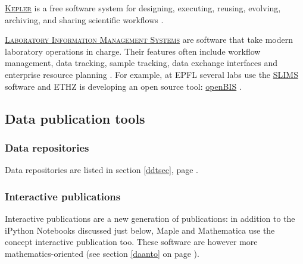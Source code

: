 \noindent {} \textsc{\href{https://kepler-project.org/}{Kepler}} is a free software system for designing, executing, reusing, evolving, archiving, and sharing scientific workflows \cite{kepler-project.org_kepler_2015,kepler-project.org_kepler_2015-1}.

\vspace{0.4cm}

\noindent {}   \textsc{\href{https://en.wikipedia.org/wiki/Laboratory_information_management_system}{Laboratory Information Management Systems}} are software that take modern laboratory operations in charge. Their features often include workflow management, data tracking, sample tracking, data exchange interfaces and enterprise resource planning \cite{wikipedia_laboratory_2015}. For example, at EPFL several labs use the \href{http://sv-it.epfl.ch/slims}{SLIMS} software and ETHZ is developing an open source tool: \href{http://www.cisd.ethz.ch/software/openBIS}{openBIS} \cite{ethz_eth_2015,epfl_lsis_2015}.


\subsection{Data publication tools}

\subsubsection{Data repositories}

Data repositories are listed in section \ref{ddtsec}, page \pageref{ddtsec}.

\subsubsection{Interactive publications}

Interactive publications are a new generation of publications: in addition to the iPython Notebooks  discussed just below, Maple and Mathematica use the concept interactive publication too. These software are however more mathematics-oriented (see section \ref{daanto} on page \pageref{daanto}).

\vspace{0.4cm}

